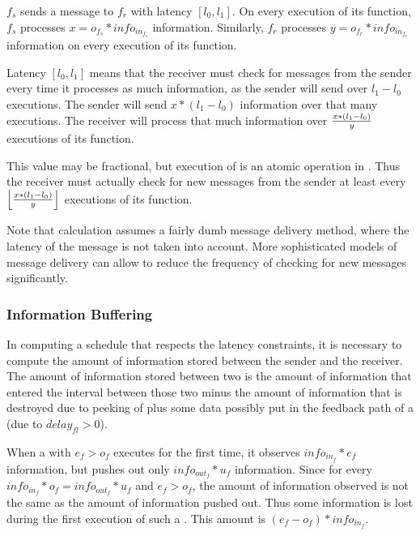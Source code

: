 {\filter} $f_s$ sends a message to {\filter} $f_r$ with latency
$[l_0,l_1]$.  On every execution of its {\work} function, {\filter}
$f_s$ processes $x = o_{f_s} * info_{in_{f_s}}$ information.
Similarly, {\filter} $f_r$ processes $y = o_{f_r} * info_{in_{f_r}}$
information on every execution of its {\work} function.

Latency $[l_0, l_1]$ means that the receiver must check for
messages from the sender every time it processes as much
information, as the sender will send over $l_1 - l_0$ executions.
The sender will send $x * (l_1 - l_0)$ information over that many
executions.  The receiver will process that much information over
${x * (l_1 - l_0) \over y}$ executions of its {\work} function.

This value may be fractional, but execution of {\filters} is an
atomic operation in {\StreamIt}.  Thus the receiver must actually
check for new messages from the sender at least every
$\left\lfloor {x * (l_1 - l_0) \over y}\right\rfloor$ executions
of its {\work} function.

Note that calculation assumes a fairly dumb message delivery
method, where the latency of the message is not taken into
account.  More sophisticated models of message delivery can allow
to reduce the frequency of checking for new messages
significantly.

\subsubsection{Information Buffering}

In computing a schedule that respects the latency constraints, it
is necessary to compute the amount of information stored between
the sender and the receiver.  The amount of information stored
between two {\filters} is the amount of information that entered the
interval between those two {\filters} minus the amount of
information that is destroyed due to peeking of {\filters} plus some
data possibly put in the feedback path of a {{\feedbackloop}} (due to
$delay_{fl} > 0$).

When a {\filter} with $e_f > o_f$ executes for the first time, it
observes $info_{in_f} * e_f$ information, but pushes out only
$info_{out_f} * u_f$ information.  Since for every {\filter}
$info_{in_f} * o_f = info_{out_f} * u_f$ and $e_f > o_f$, the
amount of information observed is not the same as the amount of
information pushed out.  Thus some information is lost during the
first execution of such a {\filter}.  This amount is $(e_f - o_f) *
info_{in_f}$.

